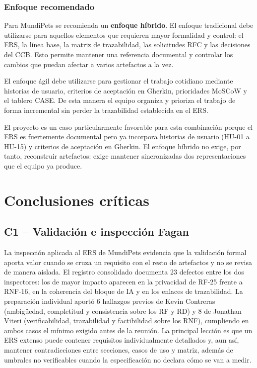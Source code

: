 \documentclass[journal,onecolumn]{IEEEtran}
\begin{document}
	\subsubsection{Enfoque recomendado}
	
	Para MundiPets se recomienda un \textbf{enfoque híbrido}. El enfoque tradicional debe utilizarse
	para aquellos elementos que requieren mayor formalidad y control: el ERS, la línea base, la matriz
	de trazabilidad, las solicitudes RFC y las decisiones del CCB. Esto permite mantener una
	referencia documental y controlar los cambios que puedan afectar a varios artefactos a la vez.
	
	El enfoque ágil debe utilizarse para gestionar el trabajo cotidiano mediante historias de usuario,
	criterios de aceptación en Gherkin, prioridades MoSCoW y el tablero CASE. De esta manera el equipo
	organiza y prioriza el trabajo de forma incremental sin perder la trazabilidad establecida en el
	ERS.
	
	El proyecto es un caso particularmente favorable para esta combinación porque el ERS es fuertemente
	documental pero ya incorpora historias de usuario (HU-01 a HU-15) y criterios de aceptación en
	Gherkin. El enfoque híbrido no exige, por tanto, reconstruir artefactos: exige mantener
	sincronizadas dos representaciones que el equipo ya produce.
	\newpage
	\section{Conclusiones críticas}
	
	\subsection*{C1 -- Validación e inspección Fagan}
	
	La inspección aplicada al ERS de MundiPets evidencia que la validación formal aporta valor cuando
	se cruza un requisito con el resto de artefactos y no se revisa de manera aislada. El registro
	consolidado documenta 23 defectos entre los dos inspectores: los de mayor impacto aparecen en la
	privacidad de RF-25 frente a RNF-16, en la coherencia del bloque de IA y en los enlaces de
	trazabilidad. La preparación individual aportó 6 hallazgos previos de Kevin Contreras (ambigüedad,
	completitud y consistencia sobre los RF y RD) y 8 de Jonathan Viteri (verificabilidad,
	trazabilidad y factibilidad sobre los RNF), cumpliendo en ambos casos el mínimo exigido antes de
	la reunión. La principal lección es que un ERS extenso puede contener requisitos individualmente
	detallados y, aun así, mantener contradicciones entre secciones, casos de uso y matriz, además de
	umbrales no verificables cuando la especificación no declara cómo se van a medir.
	
\end{document}
